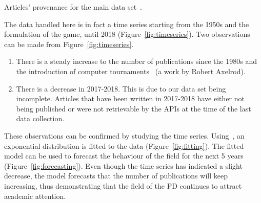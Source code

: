 \documentclass{article}
\theoremstyle{definition}
\begin{document}
\begin{table}[!hbtp]
    \begin{center}
    \resizebox{.8\textwidth}{!}{
    }
    \end{center}
    \caption{Articles' provenance for the main data set~\cite{pd_data_2018}.}
    \label{table:preliminary_table}
\end{table}

The data handled  here is in fact a time series starting from the 1950s and the formulation
of the game, until 2018 (Figure~\ref{fig:timeseries}). Two observations can be
made from Figure~\ref{fig:timeseries}.

\begin{enumerate}
    \item There is a steady increase to the number of publications since the
    1980s and the introduction of computer tournaments~\cite{Axelrod1981}
    (a work by Robert Axelrod).
    \item There is a decrease in 2017-2018. This is due to our data set being
    incomplete. Articles that have been written in 2017-2018 have either not
    being published or were not retrievable by the APIs at the time of the last
    data collection.
\end{enumerate}

These observations can be confirmed by studying the time series.
Using~\cite{scipy}, an exponential distribution is fitted to the data
(Figure~\ref{fig:fitting}). The fitted model can be used to forecast the
behaviour of the field for the next 5 years (Figure~\ref{fig:forecasting}). Even
though the time series has indicated a slight decrease, the model forecasts that
the number of publications will keep increasing, thus demonstrating that the
field of the PD continues to attract academic attention.
\end{document}
